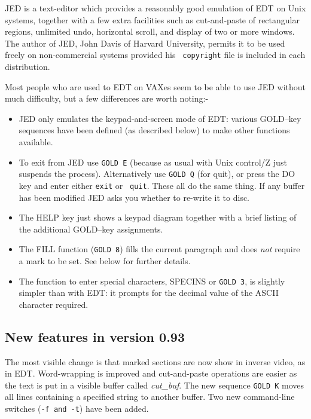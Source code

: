JED is a text-editor which provides a reasonably good emulation of EDT on
Unix systems, together with a few extra facilities such as cut-and-paste
of rectangular regions, unlimited undo, horizontal scroll, and display of
two or more windows. The author of JED, John Davis of Harvard University,
permits it to be used freely on non-commercial systems provided his {\tt
copyright} file is included in each distribution.

Most people who are used to EDT on VAXes seem to be able to use JED without
much difficulty, but a few differences are worth noting:-

\begin{itemize}

\item JED only emulates the keypad-and-screen mode of EDT: various GOLD--key
sequences have been defined (as described below) to make other functions
available.

\item To exit from JED use {\tt GOLD E} (because as usual with Unix
control/Z just suspends the process).  Alternatively use {\tt GOLD Q}
(for quit), or press the DO key and enter either {\tt exit} or {\tt
quit}.  These all do the same thing.  If any buffer has been modified JED
asks you whether to re-write it to disc.

\item The HELP key just shows a keypad diagram together with a brief
listing of the additional GOLD--key assignments.

\item The FILL function ({\tt GOLD 8}) fills the current paragraph and does
{\em not} require a mark to be set.  See below for further details.

\item The function to enter special characters, SPECINS or {\tt GOLD 3},
is slightly simpler than with EDT: it prompts for the decimal value of
the ASCII character required.

\end{itemize}

\subsection{New features in version 0.93}

The most visible change is that marked sections are now show in inverse
video, as in EDT.  Word-wrapping is improved and cut-and-paste operations
are easier as the text is put in a visible buffer called {\em cut\_buf}.
The new sequence {\tt GOLD K} moves all lines containing a specified
string to another buffer. Two new command-line switches ({\tt -f and -t})
have been added.

